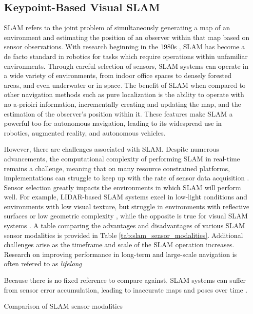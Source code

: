 \subsection{Keypoint-Based Visual SLAM}

SLAM refers to the joint problem of simultaneously generating a map of an environment and estimating the position of an observer within that map based on sensor observations. With research beginning in the 1980s \cite{smithEstimatingUncertainSpatial1988}, SLAM has become a de facto standard in robotics for tasks which require operations within unfamiliar environments. Through careful selection of sensors, SLAM systems can operate in a wide variety of environments, from indoor office spaces to densely forested areas, and even underwater or in space. The benefit of SLAM when compared to other navigation methods such as pure localization is the ability to operate with no a-prioiri information, incrementally creating and updating the map, and the estimation of the observer's position within it. These features make SLAM a powerful too for autonomous navigation, leading to its widespread use in robotics, augmented reality, and autonomous vehicles.

However, there are challenges associated with SLAM. Despite numerous advancements, the computational complexity of performing SLAM in real-time remains a challenge, meaning that on many resource constrained platforms, implementations can struggle to keep up with the rate of sensor data acquisition \cite{semenovaQuantitativeAnalysisSystem2022}. Sensor selection greatly impacts the environments in which SLAM will perform well. For example, LIDAR-based SLAM systems excel in low-light conditions and environments with low visual texture, but struggle in environments with reflective surfaces or low geometric complexity \cite{khanComparativeSurveyLiDARSLAM2021}, while the opposite is true for visual SLAM systems \cite{camposORBSLAM3AccurateOpenSource2021a}. A table comparing the advantages and disadvantages of various SLAM sensor modalities is provided in Table \ref{tab:slam_sensor_modalities}. Additional challenges arise as the timeframe and scale of the SLAM operation increases. Research on improving performance in long-term and large-scale navigation is often refered to as \textit{lifelong}

Because there is no fixed reference to compare against, SLAM systems can suffer from sensor error accumulation, leading to inaccurate maps and poses over time \cite{cadenaPresentFutureSimultaneous2016}. 

\begin{table}[ht!]
    \centering
    \caption{Comparison of SLAM sensor modalities}
    \label{tab:slam_sensor_modalities}
\end{table}